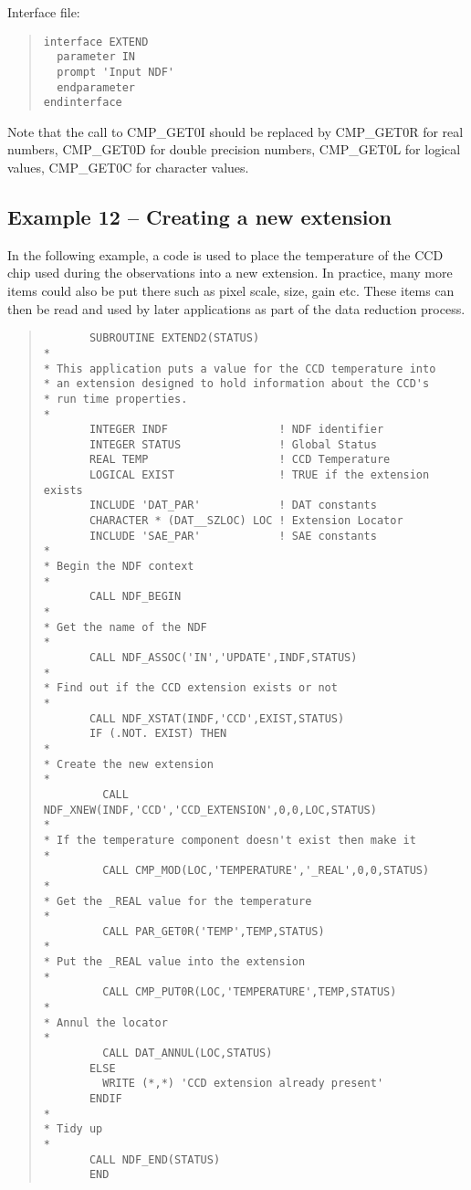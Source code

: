 Interface file:

\begin{quote}
{\small
\begin{verbatim}
interface EXTEND
  parameter IN
  prompt 'Input NDF'
  endparameter
endinterface
\end{verbatim}
}
\end{quote}

Note that the call to {\sf CMP\_GET0I} should be replaced by {\sf
CMP\_GET0R} for real numbers, {\sf CMP\_GET0D} for double precision numbers,
{\sf CMP\_GET0L} for logical values, {\sf CMP\_GET0C} for character values.

\subsection{Example 12 -- Creating a new extension}

In the following example, a code is used to place the temperature of the CCD
chip used during the observations into a new extension. In practice, many
more items could also be put there such as pixel scale, size, gain etc.
These items can then be read and used by later applications as part of
the data reduction process.

\begin{quote}
{\small
\begin{verbatim}
       SUBROUTINE EXTEND2(STATUS)
*
* This application puts a value for the CCD temperature into
* an extension designed to hold information about the CCD's
* run time properties.
*
       INTEGER INDF                 ! NDF identifier
       INTEGER STATUS               ! Global Status
       REAL TEMP                    ! CCD Temperature
       LOGICAL EXIST                ! TRUE if the extension exists
       INCLUDE 'DAT_PAR'            ! DAT constants
       CHARACTER * (DAT__SZLOC) LOC ! Extension Locator
       INCLUDE 'SAE_PAR'            ! SAE constants
*
* Begin the NDF context
*
       CALL NDF_BEGIN
*
* Get the name of the NDF
*
       CALL NDF_ASSOC('IN','UPDATE',INDF,STATUS)
*
* Find out if the CCD extension exists or not
*
       CALL NDF_XSTAT(INDF,'CCD',EXIST,STATUS)
       IF (.NOT. EXIST) THEN
*
* Create the new extension
*
         CALL NDF_XNEW(INDF,'CCD','CCD_EXTENSION',0,0,LOC,STATUS)
*
* If the temperature component doesn't exist then make it
*
         CALL CMP_MOD(LOC,'TEMPERATURE','_REAL',0,0,STATUS)
*
* Get the _REAL value for the temperature
*
         CALL PAR_GET0R('TEMP',TEMP,STATUS)
*
* Put the _REAL value into the extension
*
         CALL CMP_PUT0R(LOC,'TEMPERATURE',TEMP,STATUS)
*
* Annul the locator
*
         CALL DAT_ANNUL(LOC,STATUS)
       ELSE
         WRITE (*,*) 'CCD extension already present'
       ENDIF
*
* Tidy up
*
       CALL NDF_END(STATUS)
       END
\end{verbatim}
}
\end{quote}

